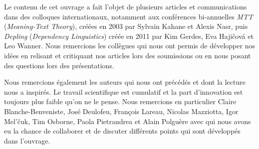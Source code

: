 \begin{sloppypar}
Le contenu de cet ouvrage a fait l’objet de plusieurs articles et communications dans des colloques internationaux, notamment aux conférences bi-annuelles \textit{MTT} (\textit{Meaning-Text Theory}), créées en 2003 par Sylvain Kahane et Alexis Nasr, puis \textit{Depling} (\textit{Dependency Linguistics}) créée en 2011 par Kim Gerdes, Eva Hajičová et Leo Wanner. Nous remercions les collègues qui nous ont permis de développer nos idées en relisant et critiquant nos articles lors des soumissions ou en nous posant des questions lors des présentations.
\end{sloppypar}

Nous remercions également les auteurs qui nous ont précédés et dont la lecture nous a inspirés. Le travail scientifique est cumulatif et la part d’innovation est toujours plus faible qu’on ne le pense. Nous remercions en particulier Claire Blanche-Benveniste, José Deulofeu, François Lareau, Nicolas Mazziotta, Igor Mel’čuk, Tim Osborne, Paola Pietrandrea et Alain Polguère avec qui nous avons eu la chance de collaborer et de discuter différents points qui sont développés dans l’ouvrage.


